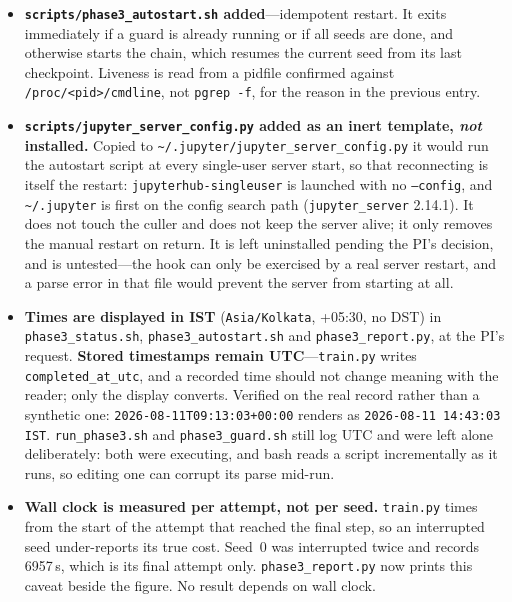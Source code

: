 \documentclass[11pt,a4paper]{article}
\newcommand{\code}[1]{\texttt{\small #1}}
\begin{document}
\begin{itemize}
reporting whether the chain is alive, every eval logged so far, per-seed
completion, and GPU memory through the CUDA API (\code{nvidia-smi} is broken on
this box). When nothing is running it prints the command to restart.
\item \textbf{\code{scripts/phase3\_autostart.sh} added}---idempotent restart.
It exits immediately if a guard is already running or if all seeds are done, and
otherwise starts the chain, which resumes the current seed from its last
checkpoint. Liveness is read from a pidfile confirmed against
\code{/proc/<pid>/cmdline}, not \code{pgrep -f}, for the reason in the previous
entry.
\item \textbf{\code{scripts/jupyter\_server\_config.py} added as an inert
template, \emph{not} installed.} Copied to
\code{\textasciitilde/.jupyter/jupyter\_server\_config.py} it would run the
autostart script at every single-user server start, so that reconnecting is
itself the restart: \code{jupyterhub-singleuser} is launched with no
\code{--config}, and \code{\textasciitilde/.jupyter} is first on the config
search path (\code{jupyter\_server} 2.14.1). It does not touch the culler and
does not keep the server alive; it only removes the manual restart on return.
It is left uninstalled pending the PI's decision, and is untested---the hook can
only be exercised by a real server restart, and a parse error in that file would
prevent the server from starting at all.
\item \textbf{Times are displayed in IST} (\code{Asia/Kolkata}, +05:30, no DST)
in \code{phase3\_status.sh}, \code{phase3\_autostart.sh} and
\code{phase3\_report.py}, at the PI's request. \textbf{Stored timestamps remain
UTC}---\code{train.py} writes \code{completed\_at\_utc}, and a recorded time
should not change meaning with the reader; only the display converts. Verified
on the real record rather than a synthetic one:
\code{2026-08-11T09:13:03+00:00} renders as \code{2026-08-11 14:43:03 IST}.
\code{run\_phase3.sh} and \code{phase3\_guard.sh} still log UTC and were left
alone deliberately: both were executing, and bash reads a script incrementally
as it runs, so editing one can corrupt its parse mid-run.
\item \textbf{Wall clock is measured per attempt, not per seed.} \code{train.py}
times from the start of the attempt that reached the final step, so an
interrupted seed under-reports its true cost. Seed~0 was interrupted twice and
records 6957\,s, which is its final attempt only. \code{phase3\_report.py} now
prints this caveat beside the figure. No result depends on wall clock.
\end{itemize}
\end{document}
